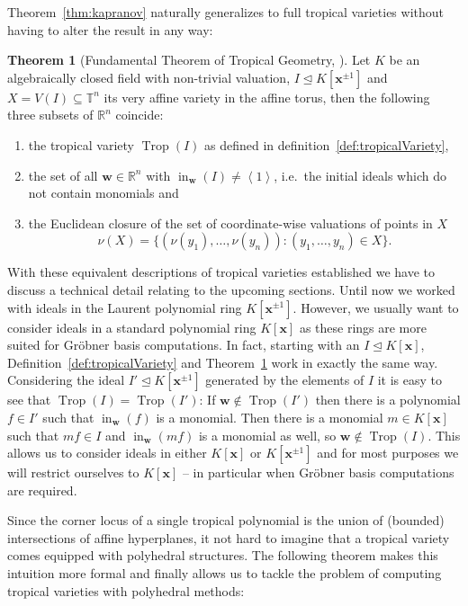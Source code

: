 \documentclass[
  paper=a4,
  titlepage,
  bibliography=totoc,
  listof=totoc,
  pagesize=pdftex
]{scrartcl}
\numberwithin{figure}{section}
\numberwithin{equation}{section}
\numberwithin{table}{section}
\newcommand*\setR{\mathds{R}}
\newcommand*\setT{\mathds{T}}
\newcommand*\ideal[1]{\left\langle #1 \right\rangle}
\let\vec\mathbf
\let\idealof\trianglelefteq
\DeclareMathOperator{\Trop}{Trop}
\DeclareMathOperator{\initial}{in}
\theoremstyle{definition}
\newtheorem{theorem}[definition]{Theorem}
\numberwithin{definition}{section}
\begin{document}
Theorem~\ref{thm:kapranov} naturally generalizes to full tropical varieties without having
to alter the result in any way:

\begin{theorem}[Fundamental Theorem of Tropical Geometry,
  {\cite[Theorem~3.2.5]{sturmMacTrop}}] \label{thm:fundamentalThm}
  Let $K$ be an algebraically closed field with non-trivial valuation, $I \idealof K[\vec
  x^{\pm1}]$ and $X = V(I) \subseteq \setT^n$ its very affine variety in the affine torus,
  then the following three subsets of $\setR^n$ coincide:
  \begin{enumerate}
    \item the tropical variety $\Trop(I)$ as defined in
      definition~\ref{def:tropicalVariety},
    \item the set of all $\vec w \in \setR^n$ with $\initial_{\vec w}(I) \neq \ideal1$,
      i.e.\ the initial ideals which do not contain monomials and
    \item \label{thm:fund:val}
      the Euclidean closure of the set of coordinate-wise valuations of points in $X$
      \[
        \nu(X) = \{ (\nu(y_1), \dots, \nu(y_n)) : (y_1, \dots, y_n) \in X \}.
      \]
  \end{enumerate}
\end{theorem}

With these equivalent descriptions of tropical varieties established we have to discuss a
technical detail relating to the upcoming sections. Until now we worked with ideals in the
Laurent polynomial ring $K[\vec x^{\pm1}]$. However, we usually want to consider ideals in
a standard polynomial ring $K[\vec x]$ as these rings are more suited for Gröbner basis
computations. In fact, starting with an $I \idealof K[\vec x]$,
Definition~\ref{def:tropicalVariety} and Theorem~\ref{thm:fundamentalThm} work in exactly
the same way. Considering the ideal $I' \idealof K[\vec x^{\pm1}]$ generated by the
elements of $I$ it is easy to see that $\Trop(I) = \Trop(I')$: If $\vec w \not\in
\Trop(I')$ then there is a polynomial $f \in I'$ such that $\initial_{\vec w}(f)$ is a
monomial. Then there is a monomial $m \in K[\vec x]$ such that $mf \in I$ and
$\initial_{\vec w}(mf)$ is a monomial as well, so $\vec w \not\in \Trop(I)$. This allows
us to consider ideals in either $K[\vec x]$ or $K[\vec x^{\pm1}]$ and for most purposes we
will restrict ourselves to $K[\vec x]$ -- in particular when Gröbner basis computations
are required.

Since the corner locus of a single tropical polynomial is the union of (bounded)
intersections of affine hyperplanes, it not hard to imagine that a tropical variety comes
equipped with polyhedral structures. The following theorem makes this intuition more
formal and finally allows us to tackle the problem of computing tropical varieties with
polyhedral methods:
\end{document}
